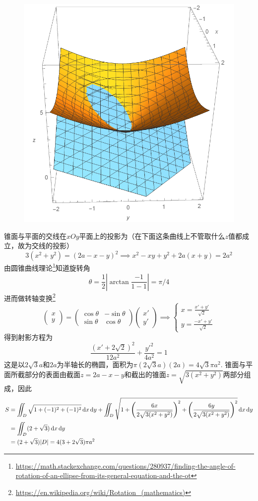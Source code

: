 \begin{analysis}
\begin{figure}[H]
\centering
\includegraphics[width=0.3\linewidth]{fig/surface_area_eg.pdf}
\end{figure}
锥面与平面的交线在$xOy$平面上的投影为（在下面这条曲线上不管取什么$z$值都成立，故为交线的投影）
\[3(x^2+y^2)=(2a-x-y)^2\implies x^2-xy+y^2+2a(x+y)=2a^2\]
由圆锥曲线理论\footnote{\url{https://math.stackexchange.com/questions/280937/finding-the-angle-of-rotation-of-an-ellipse-from-its-general-equation-and-the-ot}}知道旋转角
\[\theta=\frac{1}{2}\left|\arctan\frac{-1}{1-1}\right|=\pi/4\]
进而做转轴变换\footnote{\url{https://en.wikipedia.org/wiki/Rotation_(mathematics)}}
\[\begin{pmatrix}x\\y\end{pmatrix}=\begin{pmatrix}\cos\theta&-\sin\theta\\\sin\theta&\cos\theta\end{pmatrix}\begin{pmatrix}x'\\y'\end{pmatrix}\implies\begin{cases}x=\frac{x'+y'}{\sqrt{2}}\\y=\frac{-x'+y'}{\sqrt{2}}\end{cases}\]
得到射影方程为
\[\frac{(x'+2\sqrt{2})^2}{12a^2}+\frac{y'^2}{4a^2}=1\]
这是以$2\sqrt{3}a$和$2a$为半轴长的椭圆，面积为$\pi(2\sqrt{3}a)(2a)=4\sqrt{3}\pi a^2$.
锥面与平面所截部分的表面由截面$z=2a-x-y$和截出的锥面$z=\sqrt{3(x^2+y^2)}$两部分组成，因此
\[\begin{aligned}
S&=\iint_{D}\sqrt{1+(-1)^2+(-1)^2}\,\mathrm{d} x\,\mathrm{d} y+\iint_D\sqrt{1+\left(\frac{6x}{2\sqrt{3(x^2+y^2)}}\right)^2+\left(\frac{6y}{2\sqrt{3(x^2+y^2)}}\right)^2}\,\mathrm{d} x\,\mathrm{d} y\\
&=\iint_D(2+\sqrt{3})\,\mathrm{d} x\,\mathrm{d} y\\
&=(2+\sqrt{3})|D|=4(3+2\sqrt{3})\pi a^2
\end{aligned}\]
\end{analysis}

